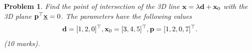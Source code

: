 \documentclass{article}
\newtheorem{prob}{Problem}
\begin{document}
\newpage
\begin{prob}
  Find the point of intersection of the 3D line $\mathbf{x} = \lambda \mathbf{d} + \mathbf{x}_0$ with
  the 3D plane $\mathbf{p}^\top \underline{\mathbf{x}} = 0$. The parameters have the
  following values
  \begin{align*}
    \mathbf{d} = [1, 2, 0]^\top, \mathbf{x}_0 = [3, 4, 5]^\top, \mathbf{p} = [1, 2, 0, 7]^\top.
  \end{align*} (10 marks).
\end{prob}
\end{document}
